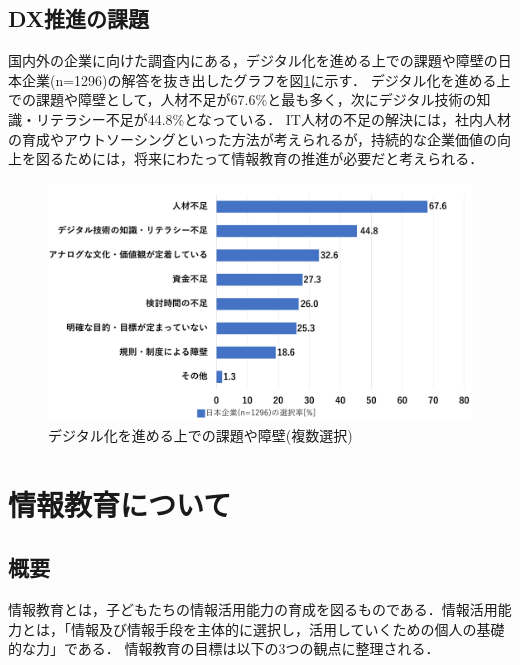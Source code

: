 \documentclass[12pt,a4j,titlepage]{ltjsarticle}
\begin{document}
\subsection{DX推進の課題}
国内外の企業に向けた調査内にある，デジタル化を進める上での課題や障壁の日本企業(n=1296)の解答を抜き出したグラフを図\ref{fig:dx}に示す\cite{dx_kadai}．
デジタル化を進める上での課題や障壁として，人材不足が67.6\%と最も多く，次にデジタル技術の知識・リテラシー不足が44.8\%となっている．
IT人材の不足の解決には，社内人材の育成やアウトソーシングといった方法が考えられるが，持続的な企業価値の向上を図るためには，将来にわたって情報教育の推進が必要だと考えられる．
\\
\begin{figure}[h]
\centering
\includegraphics[clip,width=150mm]{figures/dx.pdf}
\caption[デジタル化を進める上での課題や障壁]{デジタル化を進める上での課題や障壁(複数選択)\linebreak}
\label{fig:dx}
\end{figure}

\clearpage

\section{情報教育について}%
\subsection{概要}
情報教育とは，子どもたちの情報活用能力の育成を図るものである．情報活用能力とは，「情報及び情報手段を主体的に選択し，活用していくための個人の基礎的な力」である．
情報教育の目標は以下の3つの観点に整理される\cite{kyoiku_gaiyou}．
\end{document}
